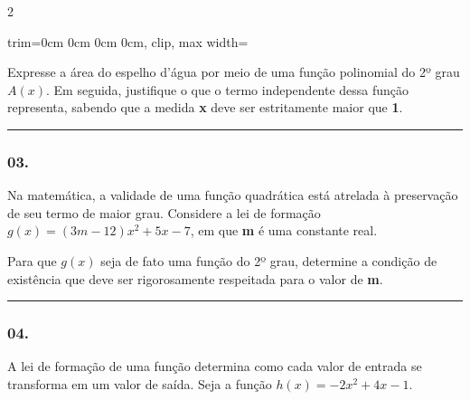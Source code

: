 \documentclass[twoside, 10pt, a4paper]{article}
\newlength{\espacoPreQuestao}
\newlength{\espacoQuestao}
\newlength{\larguraTikz}
\begin{document}
\begin{multicols*}{2}
\begin{center}
\begin{adjustbox}{trim=0cm 0cm 0cm 0cm, clip, max width=\larguraTikz}
\end{adjustbox}
\end{center}

Expresse a área do espelho d'água por meio de uma função polinomial do 2º grau $A(x)$. Em seguida, justifique o que o termo independente dessa função representa, sabendo que a medida \textbf{x} deve ser estritamente maior que \textbf{1}.
\par\vspace{\espacoQuestao}

\noindent\textcolor{CorLinha}{\rule{\linewidth}{0.5pt}} 
\par\vspace{\espacoPreQuestao}
\subsubsection*{03.} Na matemática, a validade de uma função quadrática está atrelada à preservação de seu termo de maior grau. Considere a lei de formação $g(x) = (3m - 12)x^2 + 5x - 7$, em que \textbf{m} é uma constante real.

Para que $g(x)$ seja de fato uma função do 2º grau, determine a condição de existência que deve ser rigorosamente respeitada para o valor de \textbf{m}.
\par\vspace{\espacoQuestao}

\noindent\textcolor{CorLinha}{\rule{\linewidth}{0.5pt}} 
\par\vspace{\espacoPreQuestao}
\subsubsection*{04.} A lei de formação de uma função determina como cada valor de entrada se transforma em um valor de saída. Seja a função $h(x) = -2x^2 + 4x - 1$.


\end{multicols*}
\end{document}
